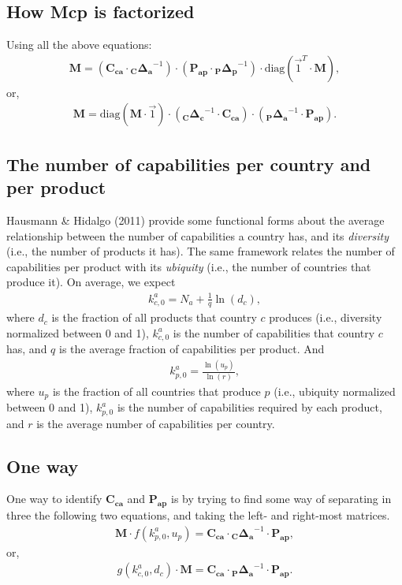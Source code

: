 \documentclass[12pt]{article}
\newcommand{\mtx}[1]{\mathbf{ #1}}
\begin{document}
\subsection{How Mcp is factorized}
Using all the above equations:
\begin{align}
	\mtx{M} = \left( \mtx{C_{ca}}\cdot \mtx{{}_C\Delta_a}^{-1} \right)\cdot\left( \mtx{P_{ap}}\cdot \mtx{{}_P\Delta_p}^{-1} \right)\cdot \text{diag}(\vec{1}^T\cdot\mtx{M}),
\end{align}
or,
\begin{align}
	\mtx{M} = \text{diag}(\mtx{M}\cdot\vec{1})\cdot \left( \mtx{{}_C\Delta_c}^{-1}\cdot\mtx{C_{ca}} \right)\cdot\left( \mtx{{}_P\Delta_a}^{-1}\cdot\mtx{P_{ap}} \right).
\end{align}

\subsection{The number of capabilities per country and per product}
Hausmann \& Hidalgo (2011) provide some functional forms about the average relationship between the number of capabilities a country has, and its \emph{diversity} (i.e., the number of products it has). The same framework relates the number of capabilities per product with its \emph{ubiquity} (i.e., the number of countries that produce it). On average, we expect
\begin{align}
	k^a_{c,0}=N_a+\frac{1}{q}\ln(d_c),
\label{eq:kac0}
\end{align}
where $d_c$ is the fraction of all products that country $c$ produces (i.e., diversity normalized between 0 and 1), $k^a_{c,0}$ is the number of capabilities that country $c$ has, and $q$ is the average fraction of capabilities per product. And
\begin{align}
	k^a_{p,0}=\frac{\ln(u_p)}{\ln(r)},
\label{eq:kap0}
\end{align}
where $u_p$ is the fraction of all countries that produce $p$ (i.e., ubiquity normalized between 0 and 1), $k^a_{p,0}$ is the number of capabilities required by each product, and $r$ is the average number of capabilities per country.

\subsection{One way}
One way to identify $\mtx{C_{ca}}$ and $\mtx{P_{ap}}$ is by trying to find some way of separating in three the following two equations, and taking the left- and right-most matrices. 
\begin{align}
	\mtx{M}\cdot f(k^a_{p,0},u_p) = \mtx{C_{ca}}\cdot \mtx{{}_C\Delta_a}^{-1} \cdot\mtx{P_{ap}},
\end{align}
or,
\begin{align}
	g(k^a_{c,0},d_c)\cdot\mtx{M} = \mtx{C_{ca}} \cdot \mtx{{}_P\Delta_a}^{-1}\cdot\mtx{P_{ap}}.
\end{align}
\end{document}
